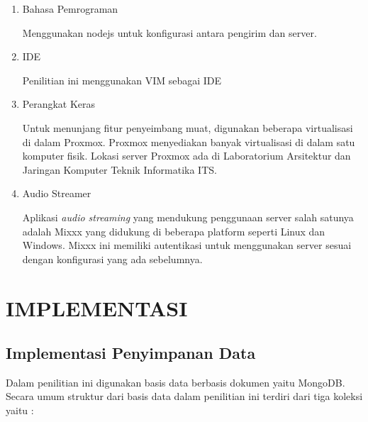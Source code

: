 \documentclass[oneside]{book}
\begin{document}
	\begin{enumerate}
		\item Bahasa Pemrograman
		
		Menggunakan nodejs untuk konfigurasi antara pengirim dan server.
		
		\item IDE
		
		Penilitian ini menggunakan VIM sebagai IDE
		
		\item Perangkat Keras
		
		Untuk menunjang fitur penyeimbang muat, digunakan beberapa virtualisasi di dalam Proxmox. Proxmox menyediakan banyak virtualisasi di dalam satu komputer fisik. Lokasi server Proxmox ada di Laboratorium Arsitektur dan Jaringan Komputer Teknik Informatika ITS.
		
		\item Audio Streamer
		
		Aplikasi \textit{audio streaming} yang mendukung penggunaan server salah satunya adalah Mixxx yang didukung di beberapa platform seperti Linux dan Windows. Mixxx ini memiliki autentikasi untuk menggunakan server sesuai dengan konfigurasi yang ada sebelumnya.
	\end{enumerate}
	
	
	\chapter{IMPLEMENTASI}
	
	\section{Implementasi Penyimpanan Data}
	Dalam penilitian ini digunakan basis data berbasis dokumen yaitu MongoDB. Secara umum struktur dari basis data dalam penilitian ini terdiri dari tiga koleksi yaitu :
	
\end{document}
